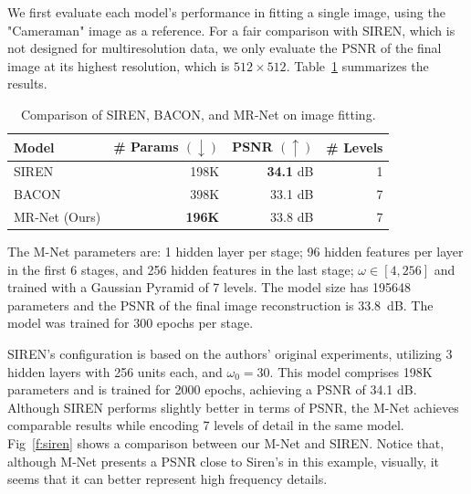 We first evaluate each model's performance in fitting a single image, using the "Cameraman" image as a reference. For a fair comparison with SIREN, which is not designed for multiresolution data, we only evaluate the PSNR of the final image at its highest resolution, which is $512 \times 512$. Table~\ref{t:comp} summarizes the results.

\begin{table}[!h]
\centering
\small
\begin{tabular}{|l|r|r|r|}
\hline
Model & \# Params $(\downarrow)$ & PSNR $(\uparrow)$ & \# Levels \\
\hline
SIREN~\cite{sitzmann2019siren} & 198K & {\bf 34.1} dB & 1  \\
BACON~\cite{bacon2021} & 398K & 33.1 dB & 7 \\
MR-Net (Ours) & {\bf 196K} & 33.8 dB & 7  \\
\hline
\end{tabular}
\caption{Comparison of SIREN, BACON, and MR-Net on image fitting.}
\label{t:comp}
\end{table}

The M-Net parameters are: 1 hidden layer per stage; 96 hidden features per layer in the first 6 stages, and 256 hidden features in the last stage; $\omega \in [4, 256]$ and trained with a Gaussian Pyramid of 7 levels. The model size has 195648 parameters and the PSNR of the final image reconstruction is 33.8~dB. The model was trained for 300 epochs per stage.

SIREN’s configuration is based on the authors' original experiments, utilizing 3 hidden layers with 256 units each, and $\omega_0 = 30$. This model comprises 198K parameters and is trained for 2000 epochs, achieving a PSNR of 34.1 dB. Although SIREN performs slightly better in terms of PSNR, the M-Net achieves comparable results while encoding 7 levels of detail in the same model. Fig~\ref{f:siren} shows a comparison between our M-Net and SIREN. Notice that, although M-Net presents a PSNR close to Siren's in this example, visually, it seems that it can better represent high frequency details.

